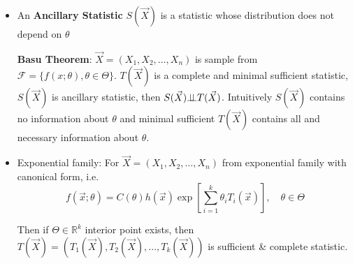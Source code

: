 \begin{itemize}
        Intuition: $ T(\vec{X}) $ is a function of $ \tilde{T}(\vec{X}) $ suggests that $ T $ contains no more information than $ \tilde{T} $. And if sufficient statistic $ T $ can be function of all sufficient statistics, then $ T(\vec{X}) $ contains `enough and minimal information' about $ \theta  $.

        Properties
        \begin{itemize}[topsep=2pt,itemsep=0pt]
            \item Sufficient \& Complete $\Rightarrow $ Minimal Sufficient ($ \not\Leftarrow $)
            
            Sufficient as `enough' + complete as `no extra' = minimal sufficient as `just enough'.
            

            \item A minimal sufficient statistic does \textbf{not} always exists.
            \item If minimal sufficient statistic exists, then any complete statistic is also minimal sufficient $  \Rightarrow  $ complete \& sufficient.
        \end{itemize}
        
        \item[$\blacktriangleright$]  An \textbf{Ancillary Statistic} $S(\vec{X})$ is a statistic whose distribution does not depend on $\theta$
        
        \textbf{Basu Theorem}: $\vec{X}=(X_1,X_2,\ldots,X_n)$ is sample from $\mathscr{F}=\{f(x;\theta),\theta\in\Theta\}$. $T(\vec{X})$ is a complete and minimal sufficient statistic, $S(\vec{X})$ is ancillary statistic, then $S(\vec{X})\bot\!\!\!\bot T(\vec{X})$. Intuitively $ S(\vec{X}) $ contains no information about $ \theta  $ and minimal sufficient $ T(\vec{X}) $ contains all and necessary information about $ \theta  $.

        \item[$\blacktriangleright$] Exponential family: For $\vec{X}=(X_1,X_2,\ldots,X_n)$ from exponential family with canonical form, i.e.
    \begin{equation}
        f(\vec{x};\theta)=C(\theta)h(\vec{x})\exp\left[\sum_{i=1}^k \theta_i T_i(\vec{x})\right] ,\quad \theta\in\Theta
    \end{equation}

    Then if $\Theta\in\mathbb{R}^k$ interior point exists, then $T(\vec{X})=(T_1(\vec{X}),T_2(\vec{X}),\ldots,T_k(\vec{X}))$ is sufficient \& complete statistic.


\end{itemize} 




